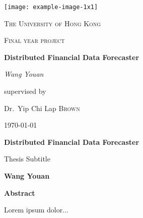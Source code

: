 \documentclass[12pt,a4paper]{report}
\begin{document}
\begin{titlepage}
	\centering
	\texttt{[image: example-image-1x1]}\par\vspace{1cm}
	{\scshape\LARGE The University of Hong Kong \par}
	\vspace{1cm}
	{\scshape\Large Final year project\par}
	\vspace{1.5cm}
	{\huge\bfseries Distributed Financial Data Forecaster\par}
	\vspace{2cm}
	{\Large\itshape Wang Youan\par}
	\vfill
	supervised by\par
	Dr.~Yip Chi Lap \textsc{Brown}

	\vfill

	{\large \today\par}
\end{titlepage}
\thispagestyle{plain}
\begin{center}
	\Large
	\textbf{Distributed Financial Data Forecaster}
	
	\vspace{0.4cm}
	\large
	Thesis Subtitle
	
	\vspace{0.4cm}
	\textbf{Wang Youan}
	
	\vspace{0.9cm}
	\textbf{Abstract}
\end{center}
Lorem ipsum dolor...
\end{document}
